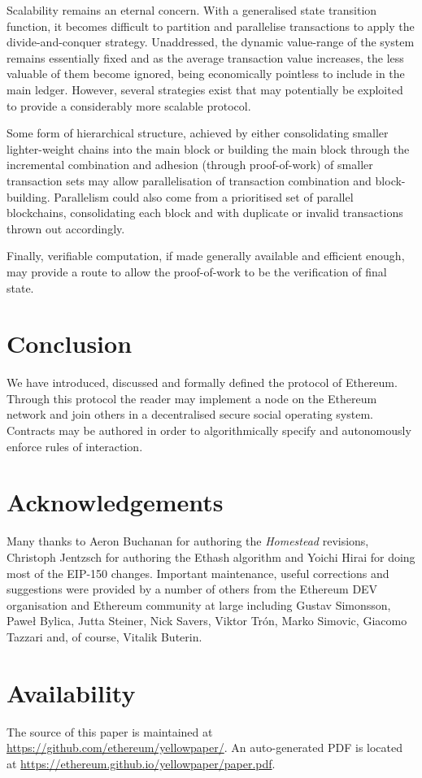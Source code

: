 \documentclass[9pt,oneside]{amsart}
\begin{document}
\begin{multicols}{2}
Scalability remains an eternal concern. With a generalised state transition function, it becomes difficult to partition and parallelise transactions to apply the divide-and-conquer strategy. Unaddressed, the dynamic value-range of the system remains essentially fixed and as the average transaction value increases, the less valuable of them become ignored, being economically pointless to include in the main ledger. However, several strategies exist that may potentially be exploited to provide a considerably more scalable protocol.

Some form of hierarchical structure, achieved by either consolidating smaller lighter-weight chains into the main block or building the main block through the incremental combination and adhesion (through proof-of-work) of smaller transaction sets may allow parallelisation of transaction combination and block-building. Parallelism could also come from a prioritised set of parallel blockchains, consolidating each block and with duplicate or invalid transactions thrown out accordingly.

Finally, verifiable computation, if made generally available and efficient enough, may provide a route to allow the proof-of-work to be the verification of final state.

\section{Conclusion} \label{ch:conclusion}

We have introduced, discussed and formally defined the protocol of Ethereum. Through this protocol the reader may implement a node on the Ethereum network and join others in a decentralised secure social operating system. Contracts may be authored in order to algorithmically specify and autonomously enforce rules of interaction.

\section{Acknowledgements}

Many thanks to Aeron Buchanan for authoring the \textit{Homestead} revisions, Christoph Jentzsch for authoring the Ethash algorithm and Yoichi Hirai for doing most of the EIP-150 changes. Important maintenance, useful corrections and suggestions were provided by a number of others from the Ethereum DEV organisation and Ethereum community at large including Gustav Simonsson, Pawe\l{} Bylica, Jutta Steiner, Nick Savers, Viktor Tr\'{o}n, Marko Simovic, Giacomo Tazzari and, of course, Vitalik Buterin.

\section{Availability}

The source of this paper is maintained at \url{https://github.com/ethereum/yellowpaper/}. An auto-generated PDF is located at \url{https://ethereum.github.io/yellowpaper/paper.pdf}.




\end{multicols}
\end{document}
